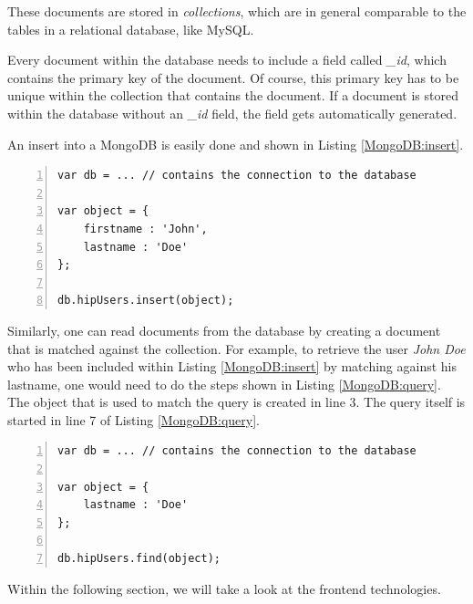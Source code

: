 These documents are stored in \emph{collections}, which are in general comparable to the tables in a relational database, like MySQL.

Every document within the database needs to include a field called \textit{\_id}, which contains the primary key of the document. Of course, this primary key has to be unique within the collection that contains the document. If a document is stored within the database without an \textit{\_id} field, the field gets automatically generated.

An insert into a MongoDB is easily done and shown in Listing \ref{MongoDB:insert}. 

\begin{lstlisting}[numbers=left,caption={Inserting into a MongoDB.},label=MongoDB:insert,frame=tlbr,breaklines]
var db = ... // contains the connection to the database

var object = {
	firstname : 'John',
	lastname : 'Doe'
};

db.hipUsers.insert(object);
\end{lstlisting}

Similarly, one can read documents from the database by creating a document that is matched against the collection.
For example, to retrieve the user \textit{John Doe} who has been included within Listing \ref{MongoDB:insert} by matching against his lastname, one would need to do the steps shown in Listing \ref{MongoDB:query}. The object that is used to match the query is created in line 3. The query itself is started in line 7 of Listing \ref{MongoDB:query}.

\begin{lstlisting}[numbers=left,caption={Reading documents from a MongoDB.},label=MongoDB:query,frame=tlbr,breaklines]
var db = ... // contains the connection to the database

var object = {
	lastname : 'Doe'
};

db.hipUsers.find(object);
\end{lstlisting}

Within the following section, we will take a look at the frontend technologies.

